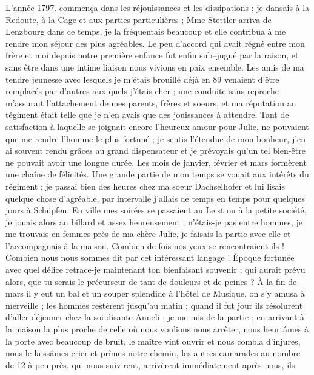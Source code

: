 \documentclass[12pt]{article}
\begin{document}
 L’année 1797. commença dans les réjouissances et les
dissipations ; je dansais à la Redoute, à la Cage et aux parties particulières ; Mme Stettler arriva
de Lenzbourg dans ce temps, je la fréquentais beaucoup et elle contribua à me rendre mon séjour des
plus agréables. Le peu d’accord qui avait régné entre mon frère et moi depuis notre première enfance
fut enfin sub–jugué par la raison, et sans être dans une intime liaison nous vivions en paix
ensemble. Les amis de ma tendre jeunesse avec lesquels je m’étais brouillé déjà en 89 venaient
d’être remplacés par d’autres aux-quels j’étais cher ; une conduite sans reproche m’assurait
l’attachement de mes parents, frè́res et soeurs, et ma réputation au tégiment était telle que je
n’en avais que des jouissances à attendre. Tant de satisfaction à laquelle se joignait encore
l’heureux amour pour Julie, ne pouvaient que me rendre l’homme le plus fortuné ; je sentis l’étendue
de mon bonheur, j’en ai souvent rendu grâces au grand dispensateur et je prévoyais qu’un tel
bien-être ne pouvait avoir une longue durée. Les mois de janvier, février et mars formèrent une
chaîne de félicités. Une grande partie de mon temps se vouait aux intérêts du régiment ; je passai
bien des heures chez ma soeur Dachselhofer et lui lisais quelque chose d’agréable, par intervalle
j’allais de temps en temps pour quelques jours à Schüpfen. En ville mes soirées se passaient au
Leist ou à la petite société, je jouais alors au billard et assez heureusement ; n’étais-je pas
entre hommes, je me trouvais en femmes près de ma chère Julie, je faisais la partie avec elle et
l’accompagnais à la maison. Combien de fois nos yeux se rencontraient-ils ! Combien nous nous sommes
dit par cet intéressant langage ! Époque fortunée avec quel délice retrace-je maintenant ton
bienfaisant souvenir ; qui aurait prévu alors, que tu serais le précurseur de tant de douleurs et de
peines ? À la fin de mars il y eut un bal et un souper splendide à l’hôtel de Musique, on s’y amusa
à merveille ; les hommes restèrent jusqu’au matin ; quand il fut jour ils résolurent d’aller
déjeuner chez la soi-disante Anneli ; je me mis de la partie ; en arrivant à la maison la plus
proche de celle où nous voulions nous arrêter, nous heurtâmes à la porte avec beaucoup de bruit, le
maître vint ouvrir et nous combla d’injures, nous le laissâmes crier et prîmes notre chemin, les
autres camarades au nombre de 12 à peu près, qui nous suivirent, arrivèrent immédiatement après
nous, ils
\end{document}
